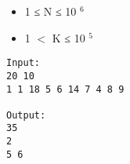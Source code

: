 \begin{itemize}
	\item     1 ≤ N ≤ 10    $^     6    $
	\item     1 $<$ K ≤ 10    $^     5    $
\end{itemize}
\begin{verbatim}
Input:
20 10
1 1 18 5 6 14 7 4 8 9

Output:
35
2
5 6
\end{verbatim}